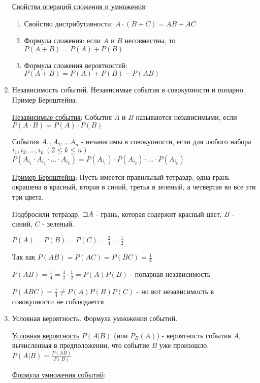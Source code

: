 \documentclass[12pt]{article}
\begin{document}
\begin{enumerate}
    \hyperlink{probabilityoperationsproperties}{Свойства операций сложения и умножения}:

    \begin{enumerate}
        \item Свойство дистрибутивности: $A \cdot (B + C) = AB + AC$

        \item Формула сложения: если $A$ и $B$ несовместны, то $P(A + B) = P(A) + P(B)$

        \item Формула сложения вероятностей: $P(A + B) = P(A) + P(B) - P(AB)$
    \end{enumerate}

    \item Независимость событий. Независимые события в совокупности и попарно. Пример Бернштейна. 

    \hyperlink{independantevents}{Независимые события}: События $A$ и $B$ называются независимыми, если $P(A \cdot B) = P(A) \cdot P(B)$

    События $A_1, A_2, \dots A_n$ - независимы в совокупности, если для любого набора $i_1, i_2, \dots, i_k \ (2 \leq k \leq n)$
    $P(A_{i_1} \cdot A_{i_2} \cdot \dots \cdot A_{i_k}) = P(A_{i_1}) \cdot P(A_{i_2}) \cdot \dots \cdot P(A_{i_k})$

    \hyperlink{bernshteinsexample}{Пример Бернштейна}: Пусть имеется правильный тетраэдр, одна грань окрашена в красный, вторая в синий, третья в зеленый, а четвертая во все эти три цвета.

    Подбросили тетраэдр, $\mathord{\sqsupset} A$ - грань, которая содержит красный цвет, $B$ - синий, $C$ - зеленый.

    $P(A) = P(B) = P(C) = \frac{2}{4} = \frac{1}{2}$

    Так как $P(AB) = P(AC) = P(BC) = \frac{1}{4}$

    $P(AB) = \frac{1}{4} = \frac{1}{2} \cdot \frac{1}{2} = P(A) P(B)$ - попарная независимость

    $P(ABC) = \frac{1}{4} \neq P(A) P(B) P(C)$ - но вот независимость в совокупности не соблюдается

    \item Условная вероятность. Формула умножения событий.

    \hyperlink{conditionalprobability}{Условная вероятность} $P(A|B)$ (или $P_B(A)$) - вероятность события $A$, вычисленная в предположении, что событие $B$ уже произошло. $P(A|B) = \frac{P(AB)}{P(B)}$

    \hyperlink{eventsmultiplicationformula}{Формула умножения событий}:


\end{enumerate}
\end{document}
